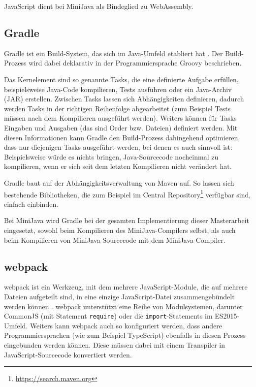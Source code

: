 JavaScript dient bei MiniJava als Bindeglied zu WebAssembly.

\subsection{Gradle}
Gradle ist ein Build-System, das sich im Java-Umfeld etabliert hat \cite{Gradle}. Der Build-Prozess wird dabei deklarativ in der Programmiersprache Groovy beschrieben.

Das Kernelement sind so genannte Tasks, die eine definierte Aufgabe erfüllen, beispielsweise Java-Code kompilieren, Tests ausführen oder ein Java-Archiv (JAR) erstellen. Zwischen Tasks lassen sich Abhängigkeiten definieren, dadurch werden Tasks in der richtigen Reihenfolge abgearbeitet (zum Beispiel Tests müssen nach dem Kompilieren ausgeführt werden). Weiters können für Tasks Eingaben und Ausgaben (das sind Order bzw. Dateien) definiert werden. Mit diesen Informationen kann Gradle den Build-Prozess dahingehend optimieren, dass nur diejenigen Tasks ausgeführt werden, bei denen es auch sinnvoll ist: Beispielsweise würde es nichts bringen, Java-Sourcecode nocheinmal zu kompilieren, wenn er sich seit dem letzten Kompilieren nicht verändert hat.

Gradle baut auf der Abhängigkeitsverwaltung von Maven auf. So lassen sich bestehende Bibliotheken, die zum Beispiel im Central Repository\footnote{\url{https://search.maven.org}} verfügbar sind, einfach einbinden.

Bei MiniJava wird Gradle bei der gesamten Implementierung dieser Masterarbeit eingesetzt, sowohl beim Kompilieren des MiniJava-Compilers selbst, als auch beim Kompilieren von MiniJava-Sourcecode mit dem MiniJava-Compiler.

\subsection{webpack}
webpack ist ein Werkzeug, mit dem mehrere JavaScript-Module, die auf mehrere Dateien aufgeteilt sind, in eine einzige JavaScript-Datei zusammengebündelt werden können \cite{Webpack}. webpack unterstützt eine Reihe von Modulsystemen, darunter CommonJS (mit Statement \lstinline{require}) oder die \lstinline{import}-Statements im ES2015-Umfeld. Weiters kann webpack auch so konfiguriert werden, dass andere Programmiersprachen (wie zum Beispiel TypeScript) ebenfalls in diesen Prozess eingebunden werden können. Diese müssen dabei mit einem Transpiler in JavaScript-Sourcecode konvertiert werden.

